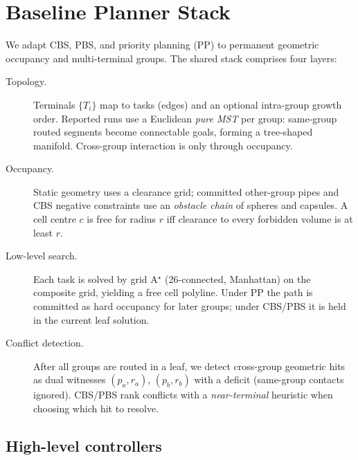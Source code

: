 
\section{Baseline Planner Stack}
\label{sec:method}

We adapt CBS, PBS, and priority planning (PP) to permanent geometric
occupancy and multi-terminal groups.
The shared stack comprises four layers:

\begin{description}
  \item[Topology.]
  Terminals $\{T_i\}$ map to tasks (edges) and an optional intra-group growth
  order.
  Reported runs use a Euclidean \emph{pure MST} per group: same-group routed
  segments become connectable goals, forming a tree-shaped manifold.
  Cross-group interaction is only through occupancy.

  \item[Occupancy.]
  Static geometry uses a clearance grid; committed other-group pipes and CBS
  negative constraints use an \emph{obstacle chain} of spheres and capsules.
  A cell centre $c$ is free for radius $r$ iff clearance to every forbidden
  volume is at least $r$.

  \item[Low-level search.]
  Each task is solved by grid A$^\star$ (26-connected, Manhattan) on the
  composite grid, yielding a free cell polyline.
  Under PP the path is committed as hard occupancy for later groups; under
  CBS/PBS it is held in the current leaf solution.

  \item[Conflict detection.]
  After all groups are routed in a leaf, we detect cross-group geometric hits
  as dual witnesses $(p_a,r_a)$, $(p_b,r_b)$ with a deficit (same-group contacts
  ignored).
  CBS/PBS rank conflicts with a \emph{near-terminal} heuristic when choosing
  which hit to resolve.
\end{description}

\subsection{High-level controllers}
\label{sec:high-level}

